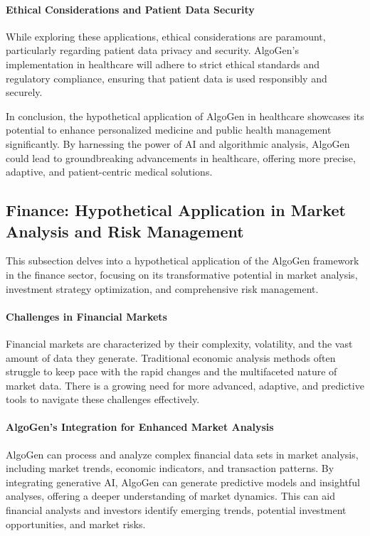 \documentclass{article}
\begin{document}
\paragraph{Ethical Considerations and Patient Data Security}
While exploring these applications, ethical considerations are paramount, particularly regarding patient data privacy and security. AlgoGen's implementation in healthcare will adhere to strict ethical standards and regulatory compliance, ensuring that patient data is used responsibly and securely.

In conclusion, the hypothetical application of AlgoGen in healthcare showcases its potential to enhance personalized medicine and public health management significantly. By harnessing the power of AI and algorithmic analysis, AlgoGen could lead to groundbreaking advancements in healthcare, offering more precise, adaptive, and patient-centric medical solutions.





\subsection{Finance: Hypothetical Application in Market Analysis and Risk Management}
This subsection delves into a hypothetical application of the AlgoGen framework in the finance sector, focusing on its transformative potential in market analysis, investment strategy optimization, and comprehensive risk management.

\paragraph{Challenges in Financial Markets}
Financial markets are characterized by their complexity, volatility, and the vast amount of data they generate. Traditional economic analysis methods often struggle to keep pace with the rapid changes and the multifaceted nature of market data. There is a growing need for more advanced, adaptive, and predictive tools to navigate these challenges effectively.

\paragraph{AlgoGen's Integration for Enhanced Market Analysis}
AlgoGen can process and analyze complex financial data sets in market analysis, including market trends, economic indicators, and transaction patterns. By integrating generative AI, AlgoGen can generate predictive models and insightful analyses, offering a deeper understanding of market dynamics. This can aid financial analysts and investors identify emerging trends, potential investment opportunities, and market risks.
\end{document}
